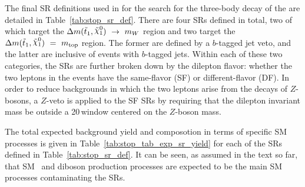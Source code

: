 The final SR definitions used in for the search for the three-body decay of the \stopone
are detailed in Table~\ref{tab:stop_sr_def}.
There are four SRs defined in total, two of which target the $\sdiff~\rightarrow~m_W$ region
and two target the $\sdiff~=~m_{\text{top}}$ region.
The former are defined by a $b$-tagged jet veto, and the latter are inclusive of
events with $b$-tagged jets.
Within each of these two categories, the SRs are further broken down by the dilepton flavor:
whether the two leptons in the events have the same-flavor (SF) or different-flavor (DF).
In order to reduce backgrounds in which the two leptons arise from the decays of $Z$-bosons,
a $Z$-veto is applied to the SF SRs by requiring that the dilepton invariant mass be outside
a 20\,\GeV window centered on the $Z$-boson mass.

The total expected background yield and composotion in terms of specific SM processes
is given in Table~\ref{tab:stop_tab_exp_sr_yield} for each of the SRs defined in Table~\ref{tab:stop_sr_def}.
It can be seen, as assumed in the text so far, that SM \ttbar~and diboson production processes
are expected to be the main SM processes contaminating the SRs.


